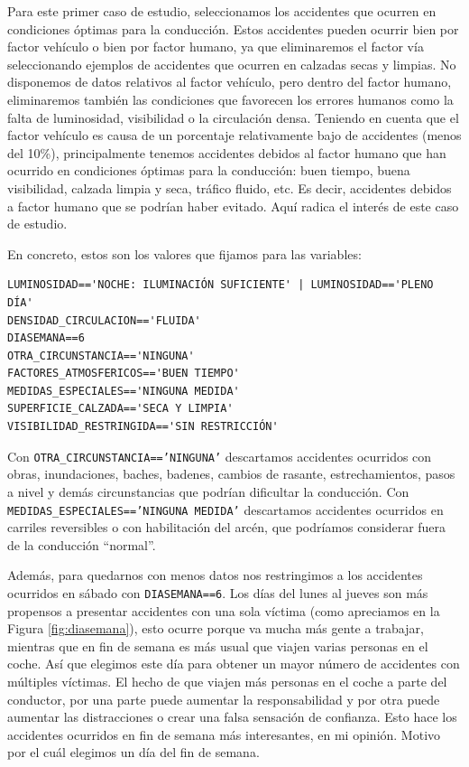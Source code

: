 \documentclass[oneside]{book}
\begin{document}
  Para este primer caso de estudio, seleccionamos los accidentes que
  ocurren en condiciones óptimas para la conducción. Estos accidentes
  pueden ocurrir bien por factor vehículo o bien por factor humano, ya
  que eliminaremos el factor vía seleccionando ejemplos de accidentes
  que ocurren en calzadas secas y limpias. No disponemos de datos
  relativos al factor vehículo, pero dentro del factor humano,
  eliminaremos también las condiciones que favorecen los errores
  humanos como la falta de luminosidad, visibilidad o la circulación
  densa. Teniendo en cuenta que el factor vehículo es causa de un
  porcentaje relativamente bajo de accidentes (menos del 10\%),
  principalmente tenemos accidentes debidos al factor humano que han
  ocurrido en condiciones óptimas para la conducción: buen tiempo,
  buena visibilidad, calzada limpia y seca, tráfico fluido, etc. Es
  decir, accidentes debidos a factor humano que se podrían haber
  evitado. Aquí radica el interés de este caso de estudio.

En concreto, estos son los valores que fijamos para las variables:

\begin{verbatim}
LUMINOSIDAD=='NOCHE: ILUMINACIÓN SUFICIENTE' | LUMINOSIDAD=='PLENO DÍA'
DENSIDAD_CIRCULACION=='FLUIDA'
DIASEMANA==6
OTRA_CIRCUNSTANCIA=='NINGUNA'
FACTORES_ATMOSFERICOS=='BUEN TIEMPO'
MEDIDAS_ESPECIALES=='NINGUNA MEDIDA'
SUPERFICIE_CALZADA=='SECA Y LIMPIA'
VISIBILIDAD_RESTRINGIDA=='SIN RESTRICCIÓN'
\end{verbatim}

Con \texttt{OTRA\_CIRCUNSTANCIA=='NINGUNA'} descartamos accidentes
ocurridos con obras, inundaciones, baches, badenes, cambios de
rasante, estrechamientos, pasos a nivel y demás circunstancias que
podrían dificultar la conducción. Con
\texttt{MEDIDAS\_ESPECIALES=='NINGUNA MEDIDA'} descartamos accidentes
ocurridos en carriles reversibles o con habilitación del arcén, que
podríamos considerar fuera de la conducción ``normal''.

Además, para quedarnos con menos datos nos restringimos a los
accidentes ocurridos en sábado con \texttt{DIASEMANA==6}. Los días del
lunes al jueves son más propensos a presentar accidentes con una sola
víctima (como apreciamos en la Figura \ref{fig:diasemana}), esto ocurre
porque va mucha más gente a trabajar, mientras que en fin de semana es
más usual que viajen varias personas en el coche. Así que elegimos
este día para obtener un mayor número de accidentes con múltiples
víctimas. El hecho de que viajen más personas en el coche a parte del
conductor, por una parte puede aumentar la responsabilidad y por otra
puede aumentar las distracciones o crear una falsa sensación de
confianza. Esto hace los accidentes ocurridos en fin de semana más
interesantes, en mi opinión. Motivo por el cuál elegimos un día del
fin de semana.
\end{document}
